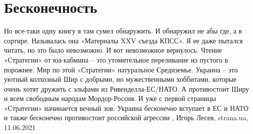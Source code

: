 
 
 
 
 
\chapter{Бесконечность}
\label{sec:slova.beskonechnost}

Но все-таки одну книгу я там сумел обнаружить. И обнаружил не абы где, а в
сортире. Называлась она «Материалы XXV съезда КПСС». Я ее даже пытался читать,
но это было невозможно. И вот невозможное вернулось. Чтение «Стратегии» от
юа-кабмина – это утомительное переливание из пустого в порожнее.  Мир по этой
«Стратегии» натуральное Средиземье. Украина – это уютный колхозный Шир с
добрыми, но мужественными хоббитами, которые очень хотят дружить с эльфами из
Ривенделла-ЕС/НАТО. А противостоит Ширу и всем свободным народам Мордор-Россия.
И уже с первой страницы «Стратегии» начинается вечный зов. Украина
\emph{бесконечно} вступает в ЕС и НАТО и также \emph{бесконечно} противостоит
российской агрессии
, Игорь Лесев, strana.ua, 11.06.2021 

